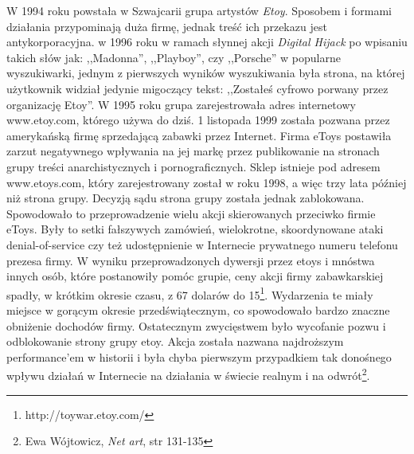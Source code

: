 \documentclass[a4paper,12pt,twoside]{article}
\begin{document}
W 1994 roku powstała w Szwajcarii grupa artystów \textit{Etoy}. Sposobem
i formami działania przypominają duża firmę, jednak treść ich przekazu jest
antykorporacyjna. w 1996 roku w ramach słynnej akcji \textit{Digital Hijack}
po wpisaniu takich słów jak: ,,Madonna'', ,,Playboy'', czy ,,Porsche''
w popularne wyszukiwarki, jednym z pierwszych wyników wyszukiwania była strona,
na której użytkownik widział jedynie migoczący tekst: ,,Zostałeś cyfrowo
porwany przez organizację Etoy''.
W 1995 roku grupa zarejestrowała adres internetowy www.etoy.com, którego
używa do dziś. 1 listopada 1999 została pozwana przez amerykańską firmę
sprzedającą zabawki przez Internet. Firma eToys postawiła zarzut
negatywnego wpływania na jej markę przez publikowanie na stronach grupy
treści anarchistycznych i pornograficznych. Sklep istnieje pod adresem
www.etoys.com, który zarejestrowany został w roku 1998, a więc trzy
lata później niż strona grupy. Decyzją sądu strona grupy została jednak
zablokowana. Spowodowało to przeprowadzenie wielu akcji skierowanych
przeciwko firmie eToys. Były to setki fałszywych zamówień, wielokrotne,
skoordynowane ataki denial-of-service czy też udostępnienie w Internecie
prywatnego numeru telefonu prezesa firmy. W wyniku przeprowadzonych
dywersji przez etoys i mnóstwa innych osób, które postanowiły pomóc grupie,
ceny akcji firmy zabawkarskiej spadły, w krótkim okresie czasu,
z 67 dolarów do 15\footnote{ http://toywar.etoy.com/}.
Wydarzenia te miały miejsce w gorącym okresie
przedświątecznym, co spowodowało bardzo znaczne obniżenie dochodów firmy.
Ostatecznym zwycięstwem było wycofanie pozwu i odblokowanie strony grupy
etoy. Akcja została nazwana najdroższym performance'em w historii i była
chyba pierwszym przypadkiem tak donośnego wpływu działań w Internecie
na działania w świecie realnym i na
odwrót\footnote{ Ewa Wójtowicz, \textit{Net art}, str 131-135}.
\end{document}
